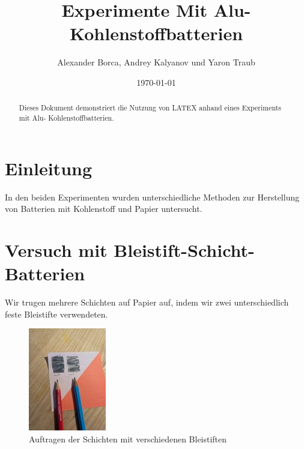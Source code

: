 \documentclass[ngerman, a4paper,12pt]{article}
\begin{document}
\title{Experimente Mit Alu- Kohlenstoffbatterien}
\author{Alexander Borca, Andrey Kalyanov und Yaron Traub}
\date{\today}
\maketitle

\begin{abstract}
	\noindent Dieses Dokument demonstriert die Nutzung von LATEX anhand eines Experiments mit Alu- Kohlenstoffbatterien.
\end{abstract}

\tableofcontents
\newpage

\listoffigures
\newpage

\section{Einleitung}
In den beiden Experimenten wurden unterschiedliche Methoden zur Herstellung von Batterien mit Kohlenstoff und Papier untersucht.

\section{Versuch mit Bleistift-Schicht-Batterien}

\noindent Wir trugen mehrere Schichten auf Papier auf, indem wir zwei unterschiedlich feste Bleistifte verwendeten.
\begin{figure}[htbp]
	\centering
	\includegraphics[height=0.3\textheight]{Bild1.jpg}
	\caption{Auftragen der Schichten mit verschiedenen Bleistiften}\label{fig:bild1}
\end{figure}
\newpage
\end{document}
